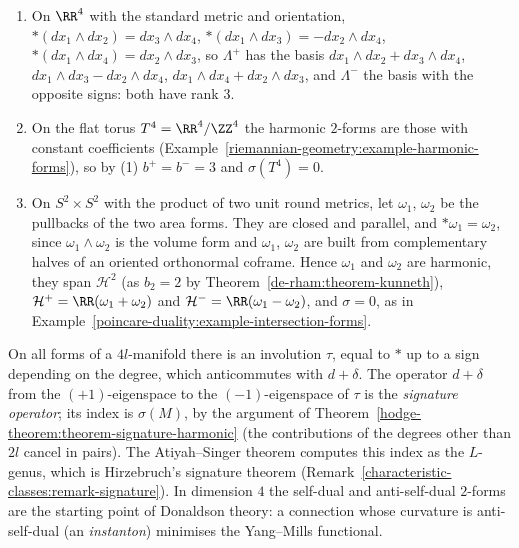 \begin{example}\label{hodge-theorem:example-self-dual}
\begin{enumerate}
\item On $\RR^4$ with the standard metric and orientation, $*(dx_1 \wedge dx_2) = dx_3 \wedge dx_4$, $*(dx_1 \wedge dx_3) = -dx_2 \wedge dx_4$, $*(dx_1 \wedge dx_4) = dx_2 \wedge dx_3$, so $\Lambda^+$ has the basis
$dx_1 \wedge dx_2 + dx_3 \wedge dx_4$, $dx_1 \wedge dx_3 - dx_2 \wedge dx_4$, $dx_1 \wedge dx_4 + dx_2 \wedge dx_3$, and $\Lambda^-$ the basis with the opposite signs: both have rank $3$.
\item On the flat torus $T^4 = \RR^4/\ZZ^4$ the harmonic $2$-forms are those with constant coefficients (Example~\ref{riemannian-geometry:example-harmonic-forms}), so by (1) $b^+ = b^- = 3$ and $\sigma(T^4) = 0$.
\item On $S^2 \times S^2$ with the product of two unit round metrics, let $\omega_1$, $\omega_2$ be the pullbacks of the two area forms. They are closed and parallel, and $*\omega_1 = \omega_2$, since
$\omega_1 \wedge \omega_2$ is the volume form and $\omega_1$, $\omega_2$ are built from complementary halves of an oriented orthonormal coframe. Hence $\omega_1$ and $\omega_2$ are harmonic, they span
$\mathcal{H}^2$ (as $b_2 = 2$ by Theorem~\ref{de-rham:theorem-kunneth}), $\mathcal{H}^+ = \RR(\omega_1 + \omega_2)$ and $\mathcal{H}^- = \RR(\omega_1 - \omega_2)$, and $\sigma = 0$, as in
Example~\ref{poincare-duality:example-intersection-forms}.
\end{enumerate}
\end{example}

\begin{remark}\label{hodge-theorem:remark-signature-operator}
On all forms of a $4l$-manifold there is an involution $\tau$, equal to $*$ up to a sign depending on the degree, which anticommutes with $d + \delta$. The operator $d + \delta$ from the $(+1)$-eigenspace to the
$(-1)$-eigenspace of $\tau$ is the \emph{signature operator}; its index is $\sigma(M)$, by the argument of Theorem~\ref{hodge-theorem:theorem-signature-harmonic} (the contributions of the degrees other than $2l$ cancel in
pairs). The Atiyah--Singer theorem computes this index as the $L$-genus, which is Hirzebruch's signature theorem (Remark~\ref{characteristic-classes:remark-signature}). In dimension $4$ the self-dual and anti-self-dual
$2$-forms are the starting point of Donaldson theory: a connection whose curvature is anti-self-dual (an \emph{instanton}) minimises the Yang--Mills functional.
\end{remark}

